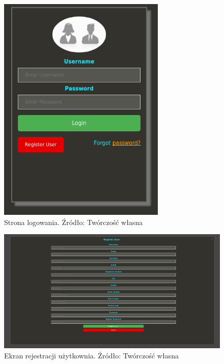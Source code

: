 \begin{figure}[H]
	\centering
	\includegraphics[width=8cm]{img/software/website/login_window.png}
	\caption{Strona logowania. Źródło: Twórczość własna}
	\label{fig:image_soft_website_login}
\end{figure}

\begin{figure}[H]
	\centering
	\includegraphics[width=17cm]{img/software/website/register_user.png}
	\caption{Ekran rejestracji użytkownia. Źródło: Twórczość własna}
	\label{fig:image_soft_website_register_user}
\end{figure}

